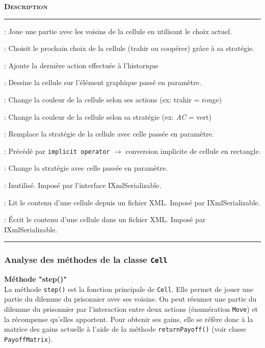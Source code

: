 \documentclass[a4paper]{article}
\begin{document}
\vspace{0.25cm}
\begin{description}[labelwidth=3.85cm]
    \small
    \item[\textbf{\textsc{Méthode}}] \textbf{\textsc{Description}}
    \vspace{0.1cm}
    \hrule{}
    \item[\texttt{step()}]                  :   Joue une partie avec les voisins de la cellule en utilisant le choix actuel.
    \item[\texttt{chooseNextMove()}]        :   Choisit le prochain choix de la cellule (trahir ou coopérer) grâce à sa stratégie.
    \item[\texttt{updateLastMove()}]        :   Ajoute la dernière action effectuée à l'historique 
    \item[\texttt{draw()}]                  :   Dessine la cellule sur l'élément graphique passé en paramètre.
    \item[\texttt{setColorFromMove()}]      :   Change la couleur de la cellule selon ses actions (ex: trahir = rouge)
    \item[\texttt{setColorFromStrategy()}]  :   Change la couleur de la cellule selon sa stratégie (ex: \textit{AC} = vert)
    \item[\texttt{updateStrategy()}]        :   Remplace la stratégie de la cellule avec celle passée en paramètre.
    \item[\texttt{Rectangle()}]             :   Précédé par \texttt{implicit operator} $\rightarrow$ conversion implicite de cellule en rectangle.
    \item[\texttt{onClick()}]               :   Change la stratégie avec celle passée en paramètre.
    \item[\texttt{GetSchema()}]             :   Inutilisé. Imposé par l'interface IXmlSerializable.
    \item[\texttt{ReadXml()}]               :   Lit le contenu d'une cellule depuis un fichier XML. Imposé par IXmlSerializable.
    \item[\texttt{WriteXml()}]              :   Écrit le contenu d'une cellule dans un fichier XML. Imposé par IXmlSerializable.
\end{description}
\hrule{}
\vspace{0.5cm}
\pagebreak

\subsubsection{Analyse des méthodes de la classe \texttt{Cell}}
\textbf{Méthode "step()"}\\
La méthode \texttt{step()} est la fonction principale de \texttt{Cell}. Elle permet de jouer une partie du dilemme du prisonnier avec ses voisins. On peut résumer une partie du dilemme du prisonnier par l'interaction entre deux actions (énumération \texttt{Move}) et la récompense qu'elles apportent. Pour obtenir ses gains, elle se réfère donc à la matrice des gains actuelle à l'aide de la méthode \texttt{returnPayoff()} (voir classe \texttt{PayoffMatrix}). 
\end{document}
